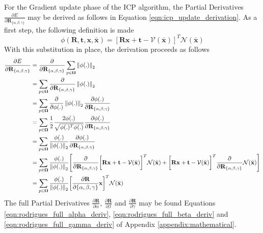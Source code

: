 For the Gradient update phase of the ICP algorithm, the Partial Derivatives
$\frac{\partial E}{\partial \mathbf{R}_{\{\alpha, \beta, \gamma\}}}$ may be
derived as follows in Equation \ref{eqn:icp_update_derivation}.
As a first step, the following definition is made
\begin{equation}
  \label{eqn:icp_deriv_sub}
  \phi(\mathbf{R}, \mathbf{t}, \mathbf{x}, \bar{\mathbf{x}}) =
  \left[
    \mathbf{Rx} + \mathbf{t} - \mathcal{V}(\bar{\mathbf{x}})
  \right]^{T}
  \mathcal{N}(\bar{\mathbf{x}})
\end{equation}
With this substitution in place, the derivation proceeds as follows
\begin{align}
  \label{eqn:icp_update_derivation_rot}
  \frac{\partial E}{\partial \mathbf{R}_{\{\alpha, \beta, \gamma\}}} & =
  \frac{\partial}{\partial \mathbf{R}_{\{\alpha, \beta, \gamma\}}}
  \sum_{p \in \mathbf{\Omega}}
  \left\lVert\phi(.)\right\rVert_{2}\\
  & = \sum_{p \in \mathbf{\Omega}}
  \frac{\partial}{\partial \mathbf{R}_{\{\alpha, \beta, \gamma\}}}
  \left\lVert\phi(.)\right\rVert_{2}\\
  & = \sum_{p \in \mathbf{\Omega}}
  \frac{\partial}{\partial \phi(.)} \left\lVert\phi(.)\right\rVert_{2}
  \frac{\partial \phi(.)}{\partial \mathbf{R}_{\{\alpha, \beta, \gamma\}}}\\
  & = \sum_{p \in \mathbf{\Omega}}
  \frac{1}{2}\frac{2 \phi(.)}{\sqrt{\phi(.)^{T}\phi(.)}}
  \frac{\partial \phi(.)}{\partial \mathbf{R}_{\{\alpha, \beta, \gamma\}}}\\
  & = \sum_{p \in \mathbf{\Omega}}
  \frac{\phi(.)}{\left\lVert\phi(.)\right\rVert_{2}}
  \frac{\partial \phi(.)}{\partial \mathbf{R}_{\{\alpha, \beta, \gamma\}}}\\
  & = \sum_{p \in \mathbf{\Omega}}
  \frac{\phi(.)}{\left\lVert\phi(.)\right\rVert_{2}}
  \Bigg[ \frac{\partial}{\partial \mathbf{R_{\{\alpha, \beta, \gamma\}}}}
  \bigg[ \mathbf{Rx} + \mathbf{t} - \mathcal{V}(\bar{\mathbf{x}}) \bigg]^{T}
  \mathcal{N}(\bar{\mathbf{x}}) + 
  \bigg[ \mathbf{Rx} + \mathbf{t} - \mathcal{V}(\bar{\mathbf{x}}) \bigg]^{T}
  \frac{\partial}{\partial \mathbf{R}_{\{\alpha, \beta, \gamma\}}}
  \mathcal{N}(\bar{\mathbf{x}})\Bigg]\\
  & = \sum_{p \in \mathbf{\Omega}}
  \frac{\phi(.)}{\left\lVert\phi(.)\right\rVert_{2}}
  \bigg[ \frac{\partial \mathbf{R}}{\partial \{\alpha, \beta, \gamma\}}
  \mathbf{x}\bigg]^{T}
  \mathcal{N}(\bar{\mathbf{x}})
\end{align}
The full Partial Derivatives $\frac{\partial \mathbf{R}}{\partial \alpha}$,
$\frac{\partial \mathbf{R}}{\partial \beta}$ and
$\frac{\partial \mathbf{R}}{\partial \gamma}$ may be found Equations
\ref{eqn:rodrigues_full_alpha_deriv}, \ref{eqn:rodrigues_full_beta_deriv}
and \ref{eqn:rodrigues_full_gamma_deriv} of Appendix 
\ref{appendix:mathematical}.


